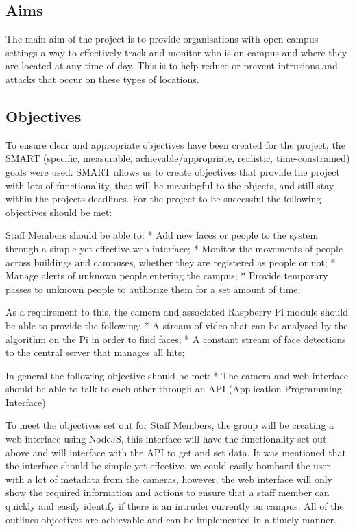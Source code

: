 \documentclass[
  english,
  a4paper,
,tablecaptionabove
]{scrartcl}
\begin{document}
\hypertarget{aims}{%
\subsection{Aims}\label{aims}}

The main aim of the project is to provide organisations with open campus
settings a way to effectively track and monitor who is on campus and
where they are located at any time of day. This is to help reduce or
prevent intrusions and attacks that occur on these types of locations.

\hypertarget{objectives}{%
\subsection{Objectives}\label{objectives}}

To ensure clear and appropriate objectives have been created for the
project, the SMART (specific, measurable, achievable/appropriate,
realistic, time-constrained) goals were used. SMART allows us to create
objectives that provide the project with lots of functionality, that
will be meaningful to the objects, and still stay within the projects
deadlines. For the project to be successful the following objectives
should be met:

Staff Members should be able to: * Add new faces or people to the system
through a simple yet effective web interface; * Monitor the movements of
people across buildings and campuses, whether they are registered as
people or not; * Manage alerts of unknown people entering the campus; *
Provide temporary passes to unknown people to authorize them for a set
amount of time;

As a requirement to this, the camera and associated Raspberry Pi module
should be able to provide the following: * A stream of video that can be
analysed by the algorithm on the Pi in order to find faces; * A constant
stream of face detections to the central server that manages all hits;

In general the following objective should be met: * The camera and web
interface should be able to talk to each other through an API
(Application Programming Interface)

To meet the objectives set out for Staff Members, the group will be
creating a web interface using NodeJS, this interface will have the
functionality set out above and will interface with the API to get and
set data. It was mentioned that the interface should be simple yet
effective, we could easily bombard the user with a lot of metadata from
the cameras, however, the web interface will only show the required
information and actions to ensure that a staff member can quickly and
easily identify if there is an intruder currently on campus. All of the
outlines objectives are achievable and can be implemented in a timely
manner.
\end{document}
